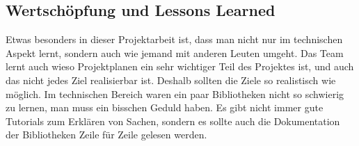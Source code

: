 \subsection{Wertschöpfung und Lessons Learned}
Etwas besonders in dieser Projektarbeit ist, dass man nicht nur im technischen Aspekt lernt, sondern auch wie jemand mit anderen Leuten umgeht. Das Team lernt auch wieso Projektplanen ein sehr wichtiger Teil des Projektes ist, und auch das nicht jedes Ziel realisierbar ist. Deshalb sollten die Ziele so realistisch wie möglich.
\bigbreak
Im technischen Bereich waren ein paar Bibliotheken nicht so schwierig zu lernen, man muss ein bisschen Geduld haben. Es gibt nicht immer gute Tutorials zum Erklären von Sachen, sondern es sollte auch die Dokumentation der Bibliotheken Zeile für Zeile gelesen werden.
